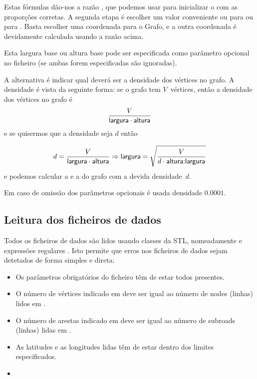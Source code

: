 \documentclass[relatorio.tex]{subfiles}
\begin{document}
Estas fórmulas dão-nos a razão , que podemos
usar para inicializar o  com as proporções
corretas. A segunda etapa é escolher um valor conveniente ou para
 ou para . Basta escolher uma coordenada
para o Grafo, e a outra coordenada é devidamente calculada
usando a razão acima.

Esta largura base ou altura base pode ser especificada como parâmetro
opcional no ficheiro  (se ambas forem especificadas são
ignoradas).

A alternativa é indicar qual deverá ser a densidade dos vértices
no grafo. A densidade é vista da seguinte forma: se o grafo
tem $V$~vértices, então a densidade dos vértices no grafo é
\begin{equation*}
\frac{V}{\sfmath{largura}\cdot\sfmath{altura}}
\end{equation*}
e se quisermos que a densidade seja $d$ então

\begin{equation*}
d=\frac{V}{\sfmath{largura}\cdot\sfmath{altura}}
\Rightarrow
\sfmath{largura}=\sqrt{\frac{V}{d\cdot\sfmath{altura:largura}}}
\end{equation*}
e podemos calcular a  e a  do grafo
com a devida densidade~$d$.

Em caso de omissão dos parâmetros opcionais é usada densidade $0.0001$.



\subsection{Leitura dos ficheiros de dados}

Todos os ficheiros de dados são lidos usando classes da STL,
nomeadamente  e expressões regulares
. Isto permite que erros nos ficheiros
de dados sejam detetados de forma simples e direta:

\begin{itemize}
\item Os parâmetros obrigatórios do ficheiro  têm
de estar todos presentes.
\item O número de vértices indicado em  deve ser
igual ao número de nodes (linhas) lidos em .
\item O número de arestas indicado em  deve ser
igual ao número de subroads (linhas) lidas em .
\item As latitudes e as longitudes lidas têm de estar dentro
dos limites especificados.
\item \textellipsis
\end{itemize}
\end{document}
